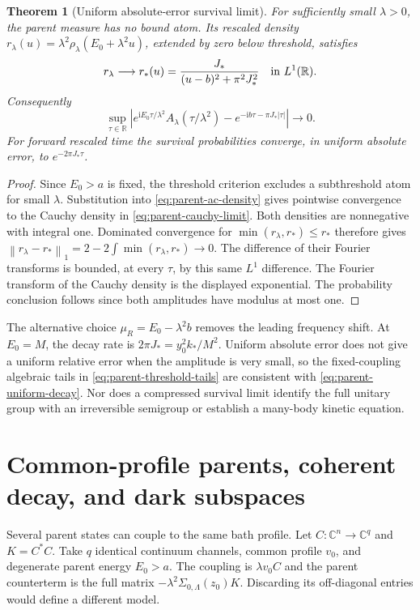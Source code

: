 \documentclass[11pt,a4paper,oneside]{book}
\theoremstyle{plain}
\newtheorem{theorem}{Theorem}[chapter]
\theoremstyle{definition}
\theoremstyle{remark}
\newcommand{\R}{\mathbb R}
\newcommand{\C}{\mathbb C}
\newcommand{\ii}{\mathrm i}
\newcommand{\norm}[1]{\left\lVert#1\right\rVert}
\newcommand{\src}[2]{\cite{#1}}
\begin{document}
\begin{theorem}[Uniform absolute-error survival limit]
\label{thm:parent-weak-coupling}
For sufficiently small $\lambda>0$, the parent measure has no bound
atom.  Its rescaled density
$r_\lambda(u)=\lambda^2\rho_\lambda(E_0+\lambda^2u)$, extended by zero
below threshold, satisfies
\begin{equation}
 r_\lambda\longrightarrow
 r_*(u)=\frac{J_*}{(u-b)^2+\pi^2J_*^2}
 \quad\hbox{in }L^1(\R).
 \label{eq:parent-cauchy-limit}
\end{equation}
Consequently
\begin{equation}
 \sup_{\tau\in\R}\left|
 e^{\ii E_0\tau/\lambda^2}A_\lambda(\tau/\lambda^2)
       -e^{-\ii b\tau-\pi J_*|\tau|}\right|\longrightarrow0.
 \label{eq:parent-uniform-decay}
\end{equation}
For forward rescaled time the survival probabilities converge, in
uniform absolute error, to $e^{-2\pi J_*\tau}$.
\end{theorem}
\begin{proof}
Since $E_0>a$ is fixed, the threshold criterion excludes a subthreshold
atom for small $\lambda$.  Substitution into
\eqref{eq:parent-ac-density} gives pointwise convergence to the
Cauchy density in \eqref{eq:parent-cauchy-limit}.  Both densities are
nonnegative with integral one.  Dominated convergence for
$\min(r_\lambda,r_*)\le r_*$ therefore gives
$\norm{r_\lambda-r_*}_1=2-2\int\min(r_\lambda,r_*)\to0$.
The difference of their Fourier transforms is bounded, at every
$\tau$, by this same $L^1$ difference.  The Fourier transform of the
Cauchy density is the displayed exponential.  The probability
conclusion follows since both amplitudes have modulus at most one.
\end{proof}
\src{R20}{thm:v20v51-L1,thm:v20v51-exponential}

The alternative choice $\mu_R=E_0-\lambda^2b$ removes the leading
frequency shift.  At $E_0=M$, the decay rate is
$2\pi J_*=y_0^2k_*/M^2$.  Uniform absolute error does not give a
uniform relative error when the amplitude is very small, so the
fixed-coupling algebraic tails in \eqref{eq:parent-threshold-tails}
are consistent with \eqref{eq:parent-uniform-decay}.  Nor does a
compressed survival limit identify the full unitary group with an
irreversible semigroup or establish a many-body kinetic equation.
\src{R20}{cor:v20v51-shift}

\section{Common-profile parents, coherent decay, and dark subspaces}
\label{sec:matrix-parent-decay}
Several parent states can couple to the same bath profile.  Let
$C:\C^n\to\C^q$ and $K=C^*C$.  Take $q$ identical continuum channels,
common profile $v_0$, and degenerate parent energy $E_0>a$.  The coupling
is $\lambda v_0C$ and the parent counterterm is the full matrix
$-\lambda^2\Sigma_{0,\Lambda}(z_0)K$.  Discarding its off-diagonal
entries would define a different model.
\end{document}
